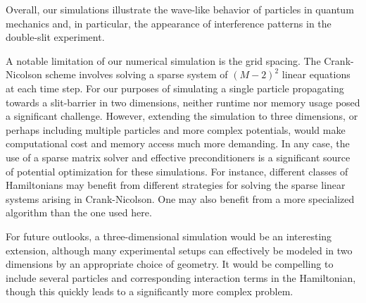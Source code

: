 \documentclass[aps,pra,reprint,amsmath,amssymb,twocolumn,preprintnumbers,superscriptaddress,10pt]{revtex4-2}
\begin{document}
Overall, our simulations illustrate the wave-like behavior of particles in quantum mechanics and, in particular, the appearance of interference patterns in the double-slit experiment.

A notable limitation of our numerical simulation is the grid spacing. 
The Crank-Nicolson scheme involves solving a sparse system of $(M-2)^{2}$ linear equations at each time step.
For our purposes of simulating a single particle propagating towards a slit-barrier in two dimensions, neither runtime nor memory usage posed a significant challenge.
However, extending the simulation to three dimensions, or perhaps including multiple particles and more complex potentials, would make computational cost and memory access much more demanding.
In any case, the use of a sparse matrix solver and effective preconditioners is a significant source of potential optimization for these simulations.
For instance, different classes of Hamiltonians may benefit from different strategies for solving the sparse linear systems arising in Crank-Nicolson.
One may also benefit from a more specialized algorithm than the one used here.

For future outlooks, a three-dimensional simulation would be an interesting extension, although many experimental setups can effectively be modeled in two dimensions by an appropriate choice of geometry.
It would be compelling to include several particles and corresponding interaction terms in the Hamiltonian, though this quickly leads to a significantly more complex problem.



\newpage

% 
% 


\end{document}

